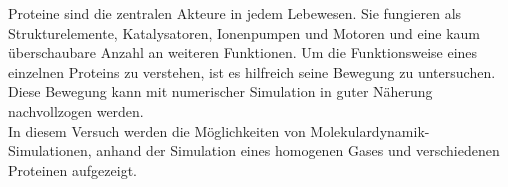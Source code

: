 Proteine sind die zentralen Akteure in jedem Lebewesen. Sie fungieren als Strukturelemente, Katalysatoren, Ionenpumpen und Motoren und eine kaum überschaubare Anzahl an weiteren Funktionen.
Um die Funktionsweise eines einzelnen Proteins zu verstehen, ist es hilfreich seine Bewegung zu untersuchen.
Diese Bewegung kann mit numerischer Simulation in guter Näherung nachvollzogen werden. 
\\
In diesem Versuch werden die Möglichkeiten von Molekulardynamik-Simulationen, 
anhand der Simulation eines homogenen Gases und verschiedenen Proteinen aufgezeigt.

